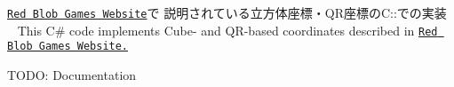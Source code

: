\href{https://www.redblobgames.com/grids/hexagons/}{\tt Red Blob Games Website}で 説明されている立方体座標・\+Q\+R座標の\+C\+::での実装 ~\newline
This C\# code implements Cube-\/ and Q\+R-\/based coordinates described in \href{https://www.redblobgames.com/grids/hexagons/}{\tt Red Blob Games Website.}

T\+O\+DO\+: Documentation 